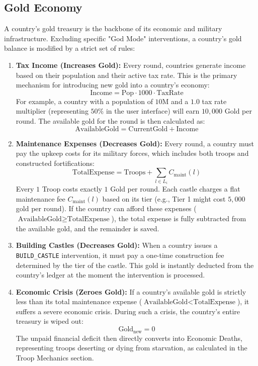 \subsection{Gold Economy}
A country's gold treasury is the backbone of its economic and military infrastructure. Excluding specific "God Mode" interventions, a country's gold balance is modified by a strict set of rules:

\begin{enumerate}
    \item \textbf{Tax Income (Increases Gold):} Every round, countries generate income based on their population and their active tax rate. This is the primary mechanism for introducing new gold into a country's economy:
    \begin{equation}
    \text{Income} = \text{Pop} \cdot 1000 \cdot \text{TaxRate}
    \end{equation}
    For example, a country with a population of $10$M and a $1.0$ tax rate multiplier (representing $50\%$ in the user interface) will earn $10,000$ Gold per round. The available gold for the round is then calculated as:
    \begin{equation}
    \text{AvailableGold} = \text{CurrentGold} + \text{Income}
    \end{equation}

    \item \textbf{Maintenance Expenses (Decreases Gold):} Every round, a country must pay the upkeep costs for its military forces, which includes both troops and constructed fortifications:
    \begin{equation}
    \text{TotalExpense} = \text{Troops} + \sum_{l \in L_i} C_{\text{maint}}(l)
    \end{equation}
    Every $1$ Troop costs exactly $1$ Gold per round. Each castle charges a flat maintenance fee $C_{\text{maint}}(l)$ based on its tier (e.g., Tier 1 might cost $5,000$ gold per round). If the country can afford these expenses ($\text{AvailableGold} \ge \text{TotalExpense}$), the total expense is fully subtracted from the available gold, and the remainder is saved.

    \item \textbf{Building Castles (Decreases Gold):} When a country issues a \texttt{BUILD\_CASTLE} intervention, it must pay a one-time construction fee determined by the tier of the castle. This gold is instantly deducted from the country's ledger at the moment the intervention is processed.
    
    \item \textbf{Economic Crisis (Zeroes Gold):} If a country's available gold is strictly less than its total maintenance expense ($\text{AvailableGold} < \text{TotalExpense}$), it suffers a severe economic crisis. During such a crisis, the country's entire treasury is wiped out:
    \begin{equation}
    \text{Gold}_{\text{new}} = 0
    \end{equation}
    The unpaid financial deficit then directly converts into Economic Deaths, representing troops deserting or dying from starvation, as calculated in the Troop Mechanics section.
\end{enumerate}


